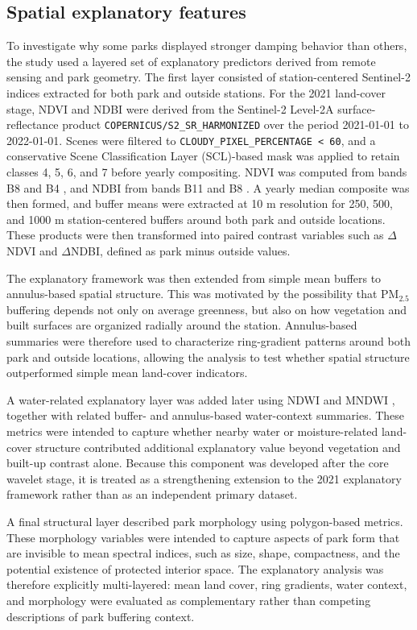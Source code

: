 \subsection{Spatial explanatory features}

To investigate why some parks displayed stronger damping behavior than others, the study used a layered set of explanatory predictors derived from remote sensing and park geometry. The first layer consisted of station-centered Sentinel-2 indices extracted for both park and outside stations. For the 2021 land-cover stage, NDVI and NDBI were derived from the Sentinel-2 Level-2A surface-reflectance product \texttt{COPERNICUS/S2\_SR\_HARMONIZED} \citep{Drusch2012} over the period 2021-01-01 to 2022-01-01. Scenes were filtered to \texttt{CLOUDY\_PIXEL\_PERCENTAGE < 60}, and a conservative Scene Classification Layer (SCL)-based mask was applied to retain classes 4, 5, 6, and 7 before yearly compositing. NDVI was computed from bands B8 and B4 \citep{Tucker1979}, and NDBI from bands B11 and B8 \citep{Zha2003}. A yearly median composite was then formed, and buffer means were extracted at 10 m resolution for 250, 500, and 1000 m station-centered buffers around both park and outside locations. These products were then transformed into paired contrast variables such as $\Delta$NDVI and $\Delta$NDBI, defined as park minus outside values.

The explanatory framework was then extended from simple mean buffers to annulus-based spatial structure. This was motivated by the possibility that PM$_{2.5}$ buffering depends not only on average greenness, but also on how vegetation and built surfaces are organized radially around the station. Annulus-based summaries were therefore used to characterize ring-gradient patterns around both park and outside locations, allowing the analysis to test whether spatial structure outperformed simple mean land-cover indicators.

A water-related explanatory layer was added later using NDWI \citep{McFeeters1996} and MNDWI \citep{Xu2006}, together with related buffer- and annulus-based water-context summaries. These metrics were intended to capture whether nearby water or moisture-related land-cover structure contributed additional explanatory value beyond vegetation and built-up contrast alone. Because this component was developed after the core wavelet stage, it is treated as a strengthening extension to the 2021 explanatory framework rather than as an independent primary dataset.

A final structural layer described park morphology using polygon-based metrics. These morphology variables were intended to capture aspects of park form that are invisible to mean spectral indices, such as size, shape, compactness, and the potential existence of protected interior space. The explanatory analysis was therefore explicitly multi-layered: mean land cover, ring gradients, water context, and morphology were evaluated as complementary rather than competing descriptions of park buffering context.

